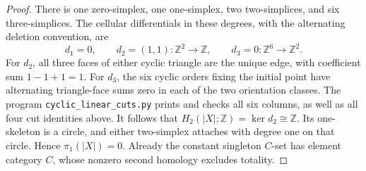 \begin{proof}
There is one zero-simplex, one one-simplex, two two-simplices,
and six three-simplices. The cellular differentials in these
degrees, with the alternating deletion convention, are
\[
 d_1=0,\qquad
 d_2=(1,1):\mathbb Z^2\longrightarrow\mathbb Z,\qquad
 d_3=0:\mathbb Z^6\longrightarrow\mathbb Z^2.
\]
For $d_2$, all three faces of either cyclic triangle are the
unique edge, with coefficient sum $1-1+1=1$. For $d_3$, the six
cyclic orders fixing the initial point have alternating
triangle-face sums zero in each of the two orientation classes.
The program \texttt{cyclic\_linear\_cuts.py} prints and checks
all six columns, as well as all four cut identities above.
It follows that $H_2(|X|;\mathbb Z)=\ker d_2\cong\mathbb Z$.
Its one-skeleton is a circle, and either two-simplex attaches
with degree one on that circle. Hence $\pi_1(|X|)=0$.
Already the constant singleton $C$-set has element category
$C$, whose nonzero second homology excludes totality.
\end{proof}
